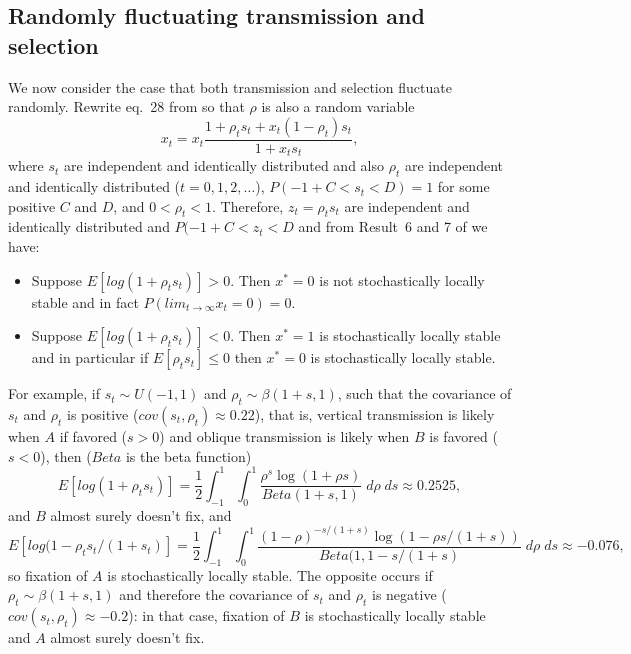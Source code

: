 \documentclass[12pt]{extarticle} %
\begin{document}
\subsection*{Randomly fluctuating transmission and selection}

We now consider the case that both transmission and selection fluctuate randomly.
Rewrite eq.~28 from \citet{Ram2018} so that $\rho$ is also a random variable
\begin{equation}
x_t = x_t \frac{1 + \rho_t s_t + x_t (1 - \rho_t) s_t}{1 + x_t s_t},
\end{equation}
where $s_t$ are independent and identically distributed and also $\rho_t$ are independent and identically distributed ($t=0,1,2,\ldots$), $P(-1+C<s_t<D)=1$ for some positive $C$ and $D$, and $0<\rho_t<1$.
Therefore, $z_t = \rho_t s_t$  are independent and identically distributed and $P(-1+C < z_t < D$ and from Result~6 and 7 of \citet{Ram2018} we have:
\begin{itemize}
\item Suppose $E[log(1+\rho_t s_t)]>0$. Then $x^*=0$ is not stochastically locally stable and in fact $P(lim_{t \to \infty} x_t=0) = 0$.
\item Suppose $E[log(1+\rho_t s_t)]<0$. Then $x^*=1$ is stochastically locally stable and in particular if $E[\rho_t s_t] \le 0$ then $x^*=0$ is stochastically locally stable.
\end{itemize}

For example, if $s_t \sim U(-1,1)$ and $\rho_t \sim \beta(1+s, 1)$, such that the covariance of $s_t$ and $\rho_t$ is positive ($cov(s_t, \rho_t) \approx 0.22$), that is, vertical transmission is likely when $A$ if favored ($s>0$) and oblique transmission is likely when $B$ is favored ($s<0$), then ($Beta$ is the beta function) 
\begin{equation}
E[log(1+\rho_t s_t)] = \frac{1}{2} \int_{-1}^{1} {\int_0^1 {\frac{\rho^s \log{(1+\rho s)}}{Beta(1+s, 1)}  \; d\rho}\; ds} \approx 0.2525,
\end{equation}
and $B$ almost surely doesn't fix, and
\begin{equation}
E[log(1-\rho_t s_t / (1+s_t)] = \frac{1}{2} \int_{-1}^{1} {\int_0^1 {\frac{(1-\rho)^{-s/(1+s)} \log{(1-\rho s / (1+s))}}{Beta(1, 1-s/(1+s)}  \; d\rho}\; ds} \approx -0.076,
\end{equation}
so fixation of $A$ is stochastically locally stable.
The opposite occurs if $\rho_t \sim \beta(1+s, 1)$ and therefore the covariance of $s_t$ and $\rho_t$ is negative ($cov(s_t, \rho_t) \approx -0.2$): in that case, fixation of $B$ is stochastically locally stable and $A$ almost surely doesn't fix.
\end{document}
